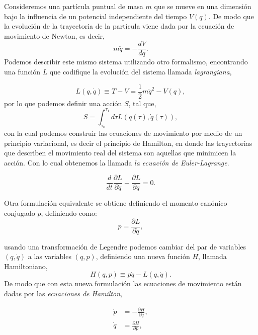Consideremos una partícula puntual de masa $m$ que se mueve en una dimensión bajo la influencia de un potencial independiente del tiempo $V(q)$. De modo que la evolución de la trayectoria de la partícula viene dada por la ecuación de movimiento de Newton, es decir,
\begin{equation*}
    m\ddot{q}=-\frac{dV}{dq}.
\end{equation*}  
Podemos describir este mismo sistema utilizando otro formalismo, encontrando una función $L$ que codifique la evolución del sistema llamada \emph{lagrangiana},
 
\begin{equation*}
    L(q,\dot{q})\equiv T-V=\frac{1}{2}m\ddot{q}^2-V(q),
\end{equation*}
por lo que podemos definir una acción $S$, tal que,
 \begin{equation*}
 S=\int_{\tau_0}^{\tau_1} d\tau L(q(\tau),\dot{q}(\tau)),
 \end{equation*}
 con la cual podemos construir las ecuaciones de movimiento por medio de un principio variacional, es decir el principio de Hamilton, en donde las trayectorias que describen el movimiento real del sistema son aquellas que minimicen la acción. Con lo cual obtenemos la llamada \emph{la ecuación de Euler-Lagrange}.

 \begin{equation*}
    \frac{d}{dt}\frac{\partial L}{\partial \dot{q}}-\frac{\partial L}{\partial q}=0.
\end{equation*} 
  
 Otra formulación equivalente se obtiene definiendo el momento canónico conjugado $p$, definiendo como:
\begin{equation*}
    p=\frac{\partial L}{\partial \dot{q}},
\end{equation*}

usando una transformación de Legendre podemos cambiar del par de variables $(q,\dot{q})$ a las variables $(q,p)$, definiendo una nueva función $H$, llamada Hamiltoniano,
\begin{equation*}
    H(q,p)\equiv p\dot{q}-L(q,\dot{q}).
\end{equation*} 
 De modo que con esta nueva formulación las ecuaciones de movimiento están dadas por las \emph{ecuaciones de Hamilton},

\begin{equation*}   
    \begin{split}        
        \dot{p}&=-\frac{\partial H}{\partial q},\\
        \dot{q}&=\frac{\partial H}{\partial p},
    \end{split}
\end{equation*} 
 
